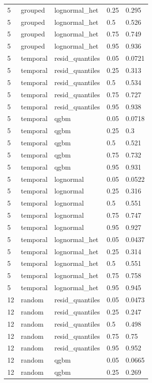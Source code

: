 \begin{tabular}{lllll}
5 & grouped & lognormal\_het & 0.25 & 0.295 \\
5 & grouped & lognormal\_het & 0.5 & 0.526 \\
5 & grouped & lognormal\_het & 0.75 & 0.749 \\
5 & grouped & lognormal\_het & 0.95 & 0.936 \\
5 & temporal & resid\_quantiles & 0.05 & 0.0721 \\
5 & temporal & resid\_quantiles & 0.25 & 0.313 \\
5 & temporal & resid\_quantiles & 0.5 & 0.534 \\
5 & temporal & resid\_quantiles & 0.75 & 0.727 \\
5 & temporal & resid\_quantiles & 0.95 & 0.938 \\
5 & temporal & qgbm & 0.05 & 0.0718 \\
5 & temporal & qgbm & 0.25 & 0.3 \\
5 & temporal & qgbm & 0.5 & 0.521 \\
5 & temporal & qgbm & 0.75 & 0.732 \\
5 & temporal & qgbm & 0.95 & 0.931 \\
5 & temporal & lognormal & 0.05 & 0.0522 \\
5 & temporal & lognormal & 0.25 & 0.316 \\
5 & temporal & lognormal & 0.5 & 0.551 \\
5 & temporal & lognormal & 0.75 & 0.747 \\
5 & temporal & lognormal & 0.95 & 0.927 \\
5 & temporal & lognormal\_het & 0.05 & 0.0437 \\
5 & temporal & lognormal\_het & 0.25 & 0.314 \\
5 & temporal & lognormal\_het & 0.5 & 0.551 \\
5 & temporal & lognormal\_het & 0.75 & 0.758 \\
5 & temporal & lognormal\_het & 0.95 & 0.945 \\
12 & random & resid\_quantiles & 0.05 & 0.0473 \\
12 & random & resid\_quantiles & 0.25 & 0.247 \\
12 & random & resid\_quantiles & 0.5 & 0.498 \\
12 & random & resid\_quantiles & 0.75 & 0.75 \\
12 & random & resid\_quantiles & 0.95 & 0.952 \\
12 & random & qgbm & 0.05 & 0.0665 \\
12 & random & qgbm & 0.25 & 0.269 \\

\end{tabular}

